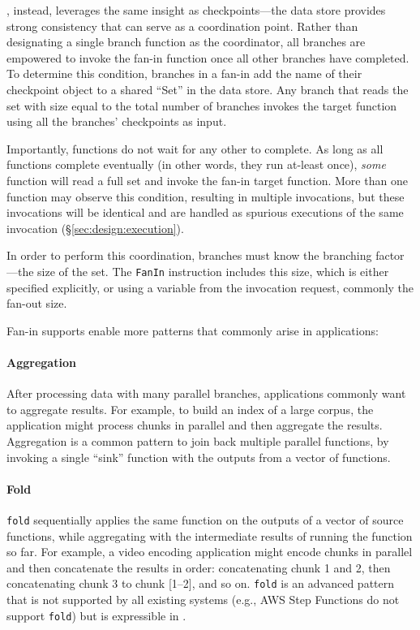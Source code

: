\name{}, instead, leverages the same insight as checkpoints---the data store
provides strong consistency that can serve as a coordination point. Rather
than designating a single branch function as the coordinator, all branches are
empowered to invoke the fan-in function once all other branches have
completed. To determine this condition, branches in a fan-in add the name of
their checkpoint object to a shared ``Set'' in the data store. Any branch that
reads the set with size equal to the total number of branches invokes the
target function using all the branches' checkpoints as input.

Importantly, functions do not wait for any other to complete. As long as all
functions complete eventually (in other words, they run at-least once),
\emph{some} function will read a full set and invoke the fan-in target function.
More than one function may observe this condition, resulting in multiple
invocations, but these invocations will be identical and are handled as spurious
executions of the same invocation (\S\ref{sec:design:execution}).

In order to perform this coordination, branches must know the branching
factor---the size of the set. The \texttt{FanIn} instruction includes this size,
which is either specified explicitly, or using a variable from the invocation
request, commonly the fan-out size.


Fan-in supports enable more patterns that commonly arise in applications:

\paragraph{Aggregation}
After processing data with many parallel branches, applications commonly want to
aggregate results. For example, to build an index of a large corpus, the
application might process chunks in parallel and then aggregate the results.
Aggregation is a common pattern to join back multiple parallel functions, by
invoking a single ``sink'' function with the outputs from a vector of functions.

\paragraph{Fold}
\texttt{fold} sequentially applies the same function on the outputs of a vector
of source functions, while aggregating with the intermediate results of running
the function so far. For example, a video encoding application might encode
chunks in parallel and then concatenate the results in order: concatenating
chunk 1 and 2, then concatenating chunk 3 to chunk [1--2], and so on.
\texttt{fold} is an advanced pattern that is not supported by all existing
systems (e.g., AWS Step Functions do not support \texttt{fold}) but is
expressible in \name{}.


